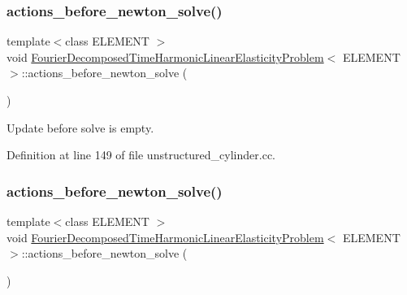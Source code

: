 \subsubsection{\texorpdfstring{actions\+\_\+before\+\_\+newton\+\_\+solve()}{actions\_before\_newton\_solve()}\hspace{0.1cm}{\footnotesize\ttfamily [2/3]}}
{\footnotesize\ttfamily template$<$class E\+L\+E\+M\+E\+NT $>$ \\
void \hyperlink{classFourierDecomposedTimeHarmonicLinearElasticityProblem}{Fourier\+Decomposed\+Time\+Harmonic\+Linear\+Elasticity\+Problem}$<$ E\+L\+E\+M\+E\+NT $>$\+::actions\+\_\+before\+\_\+newton\+\_\+solve (\begin{DoxyParamCaption}{ }\end{DoxyParamCaption})\hspace{0.3cm}{\ttfamily [inline]}}



Update before solve is empty. 



Definition at line 149 of file unstructured\+\_\+cylinder.\+cc.

\mbox{\label{classFourierDecomposedTimeHarmonicLinearElasticityProblem_ad9a3f48c3b399c4595f73d3f1e9a14ef}} 
\subsubsection{\texorpdfstring{actions\+\_\+before\+\_\+newton\+\_\+solve()}{actions\_before\_newton\_solve()}\hspace{0.1cm}{\footnotesize\ttfamily [3/3]}}
{\footnotesize\ttfamily template$<$class E\+L\+E\+M\+E\+NT $>$ \\
void \hyperlink{classFourierDecomposedTimeHarmonicLinearElasticityProblem}{Fourier\+Decomposed\+Time\+Harmonic\+Linear\+Elasticity\+Problem}$<$ E\+L\+E\+M\+E\+NT $>$\+::actions\+\_\+before\+\_\+newton\+\_\+solve (\begin{DoxyParamCaption}{ }\end{DoxyParamCaption})\hspace{0.3cm}{\ttfamily [inline]}}



